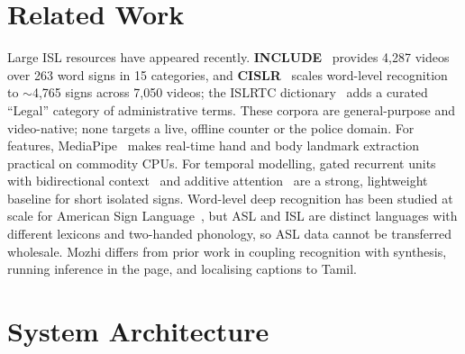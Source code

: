 \documentclass[conference]{IEEEtran}
\begin{document}
\section{Related Work}
Large ISL resources have appeared recently. \textbf{INCLUDE}~\cite{include}
provides 4{,}287 videos over 263 word signs in 15 categories, and
\textbf{CISLR}~\cite{cislr} scales word-level recognition to $\sim$4{,}765 signs
across 7{,}050 videos; the ISLRTC dictionary~\cite{islrtc} adds a curated
``Legal'' category of administrative terms. These corpora are general-purpose
and video-native; none targets a live, offline counter or the police domain.
For features, MediaPipe~\cite{mediapipe} makes real-time hand and body landmark
extraction practical on commodity CPUs. For temporal modelling, gated recurrent
units~\cite{gru} with bidirectional context~\cite{birnn} and additive
attention~\cite{attention} are a strong, lightweight baseline for short isolated
signs. Word-level deep recognition has been studied at scale for American Sign
Language~\cite{wlasl}, but ASL and ISL are distinct languages with different
lexicons and two-handed phonology, so ASL data cannot be transferred wholesale.
Mozhi differs from prior work in coupling recognition with synthesis, running
inference in the page, and localising captions to Tamil.

\section{System Architecture}
\end{document}
